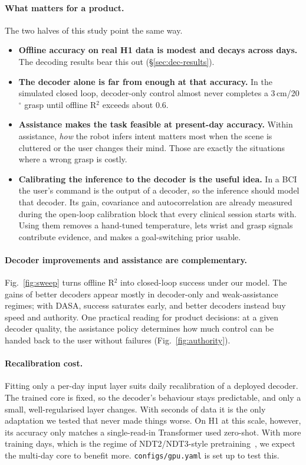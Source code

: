 \paragraph{What matters for a product.} The two halves of this study point the same way.

\begin{itemize}
\item \textbf{Offline accuracy on real H1 data is modest and decays across days.} The decoding results bear this out (\S\ref{sec:dec-results}).
\item \textbf{The decoder alone is far from enough at that accuracy.} In the simulated closed loop, decoder-only control almost never completes a 3\,cm/20$^\circ$ grasp until offline R$^2$ exceeds about 0.6.
\item \textbf{Assistance makes the task feasible at present-day accuracy.} Within assistance, \emph{how} the robot infers intent matters most when the scene is cluttered or the user changes their mind. Those are exactly the situations where a wrong grasp is costly.
\item \textbf{Calibrating the inference to the decoder is the useful idea.} In a BCI the user's command is the output of a decoder, so the inference should model that decoder. Its gain, covariance and autocorrelation are already measured during the open-loop calibration block that every clinical session starts with. Using them removes a hand-tuned temperature, lets wrist and grasp signals contribute evidence, and makes a goal-switching prior usable.
\end{itemize}

\paragraph{Decoder improvements and assistance are complementary.} Fig.~\ref{fig:sweep} turns offline R$^2$ into closed-loop success under our model. The gains of better decoders appear mostly in decoder-only and weak-assistance regimes; with DASA, success saturates early, and better decoders instead buy speed and authority. One practical reading for product decisions: at a given decoder quality, the assistance policy determines how much control can be handed back to the user without failures (Fig.~\ref{fig:authority}).

\paragraph{Recalibration cost.} Fitting only a per-day input layer suits daily recalibration of a deployed decoder. The trained core is fixed, so the decoder's behaviour stays predictable, and only a small, well-regularised layer changes. With seconds of data it is the only adaptation we tested that never made things worse. On H1 at this scale, however, its accuracy only matches a single-read-in Transformer used zero-shot. With more training days, which is the regime of NDT2/NDT3-style pretraining~\cite{ye2023neural,ye2025generalist}, we expect the multi-day core to benefit more. \texttt{configs/gpu.yaml} is set up to test this.

